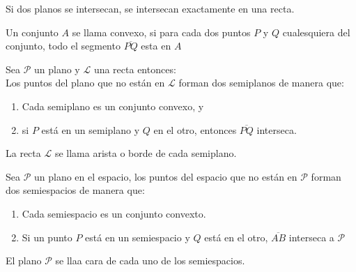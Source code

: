 \begin{tcolorbox}[colback=black!9!,colframe=white]
\begin{post} Si dos planos se intersecan, se intersecan exactamente en una recta.
\end{post}
\end{tcolorbox}

\begin{tcolorbox}[colback=black!3!,colframe=white]
\begin{def.}
Un conjunto $A$ se llama convexo, si para cada dos puntos $P$ y $Q$ cualesquiera del conjunto, todo el segmento $\overline{PQ}$ esta en $A$
\begin{multicols}{3}
\begin{tikzpicture}

\end{tikzpicture}
\end{multicols}
\end{def.}
\end{tcolorbox}

\begin{tcolorbox}[colback=black!9!,colframe=white]
\begin{post} Sea $\mathscr{P}$ un plano y $\mathscr{L}$ una recta entonces:\\
Los puntos del plano que no están en $\mathscr{L}$ forman dos semiplanos de manera que:
\begin{enumerate}[\bfseries a)]
\item Cada semiplano es un conjunto convexo, y
\item si $P$ está en un semiplano y $Q$ en el otro, entonces $\overline{PQ}$ interseca.
\end{enumerate}
La recta $\mathscr{L}$ se llama arista o borde de cada semiplano.
\end{post}
\end{tcolorbox}

\begin{tcolorbox}[colback=black!9!,colframe=white]
\begin{post}
Sea $\mathscr{P}$ un plano en el espacio, los puntos del espacio que no están en $\mathscr{P}$ forman dos semiespacios de manera que:
\begin{enumerate}[\bfseries a)]
\item Cada semiespacio es un conjunto convexto.
\item Si un punto $P$ está en un semiespacio y $Q$ está en el otro, $\overline{AB}$ interseca a $\mathscr{P}$
\end{enumerate} 
\end{post}
El plano $\mathscr{P}$ se llaa cara de cada uno de los semiespacios.
\end{tcolorbox}

